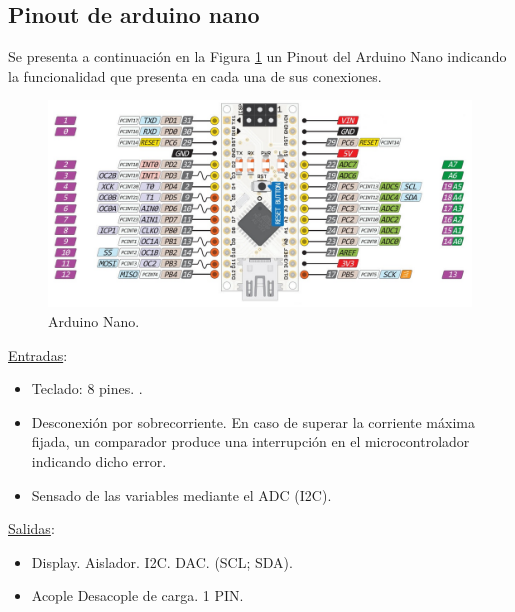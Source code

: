 \subsection{Pinout de arduino nano}
Se presenta a continuación en la Figura \ref{F:arduino_nano} un Pinout del Arduino Nano indicando la funcionalidad que presenta en cada una de sus conexiones.
\begin{figure}[H]
    \centering
    \includegraphics[scale=0.3]{./imagenes/arduino_nano.jpg}
    \caption{Arduino Nano.}
    \label{F:arduino_nano}
\end{figure}\par 
\underline{Entradas}:
\begin{itemize}
    \item Teclado: 8 pines. .
    \item Desconexión por sobrecorriente. En caso de superar la corriente máxima fijada, un comparador produce una interrupción en el microcontrolador indicando dicho error.
    \item Sensado de las variables mediante el ADC (I2C).
\end{itemize}\par 
\underline{Salidas}:
\begin{itemize}
    \item Display. Aislador. I2C. DAC.  (SCL; SDA).
    \item Acople Desacople de carga. 1 PIN.
\end{itemize}\par 

